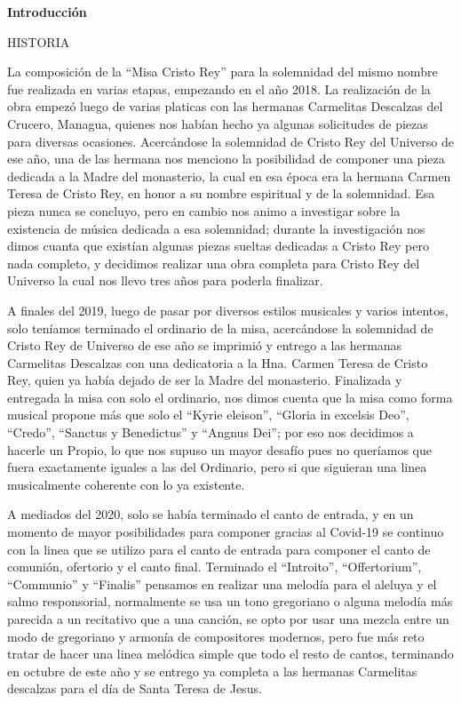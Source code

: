 \documentclass[12pt, letterpaper]{report}
\begin{document}
    \begin{center}
        \vspace*{9cm}
        \textbf{\Huge Introducci\'on}
    \end{center}
    \clearpage

    {\large HISTORIA}

    La composici\'on de la ``Misa Cristo Rey'' para la solemnidad del mismo nombre fue realizada en varias etapas, empezando en el a\~no 2018. La realizaci\'on de la obra empez\'o luego de varias platicas con las hermanas Carmelitas Descalzas del Crucero, Managua, quienes nos hab\'ian hecho ya algunas solicitudes de piezas para diversas ocasiones. Acerc\'andose la solemnidad de Cristo Rey del Universo de ese a\~no, una de las hermana nos menciono la posibilidad de componer una pieza dedicada a la Madre del monasterio, la cual en esa \'epoca era la hermana Carmen Teresa de Cristo Rey, en honor a su nombre espiritual y de la solemnidad. Esa pieza nunca se concluyo, pero en cambio nos animo a investigar sobre la existencia de m\'usica dedicada a esa solemnidad; durante la investigaci\'on nos dimos cuanta que exist\'ian algunas piezas sueltas dedicadas a Cristo Rey pero nada completo, y decidimos realizar una obra completa para Cristo Rey del Universo la cual nos llevo tres a\~nos para poderla finalizar.

    A finales del 2019, luego de pasar por diversos estilos musicales y varios intentos, solo ten\'iamos terminado el ordinario de la misa, acerc\'andose la solemnidad de Cristo Rey de Universo de ese a\~no se imprimi\'o y entrego a las hermanas Carmelitas Descalzas con una dedicatoria a la Hna. Carmen Teresa de Cristo Rey, quien ya hab\'ia dejado de ser la Madre del monasterio. Finalizada y entregada la misa con solo el ordinario, nos dimos cuenta que la misa como forma musical propone m\'as que solo el ``Kyrie eleison'', ``Gloria in excelsis Deo'', ``Credo'', ``Sanctus y Benedictus'' y ``Angnus Dei''; por eso nos decidimos a hacerle un Propio, lo que nos supuso un mayor desaf\'io pues no quer\'iamos que fuera exactamente iguales a las del Ordinario, pero si que siguieran una linea musicalmente coherente con lo ya existente.

    A mediados del 2020, solo se hab\'ia terminado el canto de entrada, y en un momento de mayor posibilidades para componer gracias al Covid-19 se continuo con la linea que se utilizo para el canto de entrada para componer el canto de comuni\'on, ofertorio y el canto final.  Terminado el ``Introito'', ``Offertorium'', ``Communio'' y ``Finalis'' pensamos en realizar una melod\'ia para el aleluya y el salmo responsorial, normalmente se usa un tono gregoriano o alguna melod\'ia m\'as parecida a un recitativo que a una canci\'on, se opto por usar una mezcla entre un modo de gregoriano y armon\'ia de compositores modernos, pero fue m\'as reto tratar de hacer una linea mel\'odica simple que todo el resto de cantos, terminando en octubre de este a\~no y se entrego ya completa a las hermanas Carmelitas descalzas para el d\'ia de Santa Teresa de Jesus.
\end{document}
